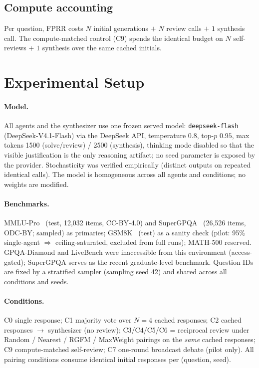 \documentclass[11pt]{article}
\begin{document}
\subsection{Compute accounting}
Per question, FPRR costs $N$ initial generations $+$ $N$ review calls $+$ $1$ synthesis call. The compute-matched control (C9) spends the identical budget on $N$ self-reviews $+$ $1$ synthesis over the same cached initials.

\section{Experimental Setup}
\label{sec:setup}

\paragraph{Model.} All agents and the synthesizer use one frozen served model: \texttt{deepseek-flash} (DeepSeek-V4.1-Flash) via the DeepSeek API, temperature $0.8$, top-$p$ $0.95$, max tokens 1500 (solve/review) / 2500 (synthesis), thinking mode disabled so that the visible justification is the only reasoning artifact; no seed parameter is exposed by the provider. Stochasticity was verified empirically (distinct outputs on repeated identical calls). The model is homogeneous across all agents and conditions; no weights are modified.

\paragraph{Benchmarks.} MMLU-Pro~\cite{mmlupro} (test, 12{,}032 items, CC-BY-4.0) and SuperGPQA~\cite{supergpqa} (26{,}526 items, ODC-BY; sampled) as primaries; GSM8K~\cite{gsm8k} (test) as a sanity check (pilot: 95\% single-agent $\Rightarrow$ ceiling-saturated, excluded from full runs); MATH-500 reserved. GPQA-Diamond and LiveBench were inaccessible from this environment (access-gated); SuperGPQA serves as the recent graduate-level benchmark. Question IDs are fixed by a stratified sampler (sampling seed 42) and shared across all conditions and seeds.

\paragraph{Conditions.} C0 single response; C1 majority vote over $N{=}4$ cached responses; C2 cached responses $\rightarrow$ synthesizer (no review); C3/C4/C5/C6 = reciprocal review under Random / Nearest / RGFM / MaxWeight pairings on the \emph{same} cached responses; C9 compute-matched self-review; C7 one-round broadcast debate (pilot only). All pairing conditions consume identical initial responses per (question, seed).
\end{document}

